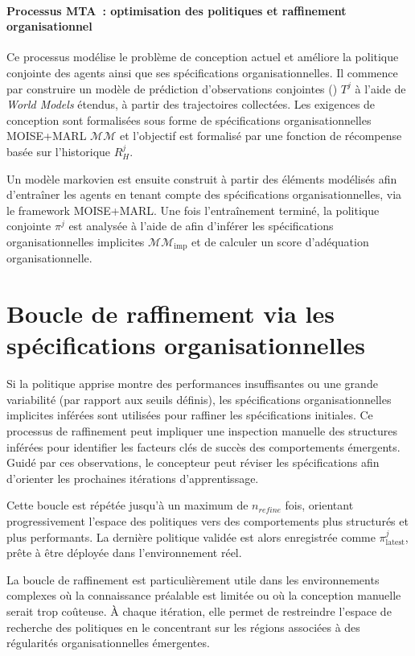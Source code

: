 \paragraph{Processus MTA~: optimisation des politiques et raffinement organisationnel}

Ce processus modélise le problème de conception actuel et améliore la politique conjointe des agents ainsi que ses spécifications organisationnelles. Il commence par construire un modèle de prédiction d'observations conjointes () $T^j$ à l'aide de \textit{World Models} étendus, à partir des trajectoires collectées. Les exigences de conception sont formalisées sous forme de spécifications organisationnelles MOISE+MARL $\mathcal{MM}$ et l'objectif est formalisé par une fonction de récompense basée sur l'historique $R^j_H$.

Un modèle markovien est ensuite construit à partir des éléments modélisés afin d'entraîner les agents en tenant compte des spécifications organisationnelles, via le framework MOISE+MARL. Une fois l'entraînement terminé, la politique conjointe $\pi^j$ est analysée à l'aide de  afin d'inférer les spécifications organisationnelles implicites $\mathcal{MM}_{\text{imp}}$ et de calculer un score d'adéquation organisationnelle.

\section{Boucle de raffinement via les spécifications organisationnelles}

Si la politique apprise montre des performances insuffisantes ou une grande variabilité (par rapport aux seuils définis), les spécifications organisationnelles implicites inférées sont utilisées pour raffiner les spécifications initiales. Ce processus de raffinement peut impliquer une inspection manuelle des structures inférées pour identifier les facteurs clés de succès des comportements émergents. Guidé par ces observations, le concepteur peut réviser les spécifications afin d'orienter les prochaines itérations d'apprentissage.

Cette boucle est répétée jusqu'à un maximum de $n_{refine}$ fois, orientant progressivement l'espace des politiques vers des comportements plus structurés et plus performants. La dernière politique validée est alors enregistrée comme $\pi^j_{\text{latest}}$, prête à être déployée dans l'environnement réel.

La boucle de raffinement est particulièrement utile dans les environnements complexes où la connaissance préalable est limitée ou où la conception manuelle serait trop coûteuse. À chaque itération, elle permet de restreindre l'espace de recherche des politiques en le concentrant sur les régions associées à des régularités organisationnelles émergentes.

